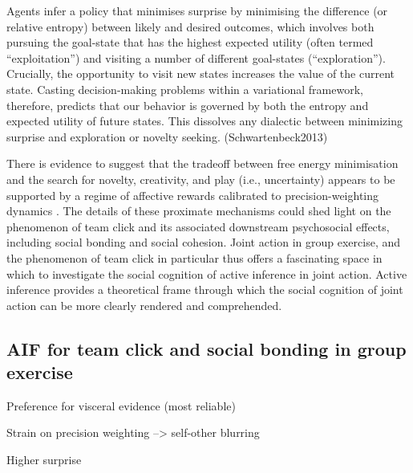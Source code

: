 \begin{CJK}{UTF8}{gbsn}
Agents infer a policy that minimises surprise by minimising the difference (or relative entropy) between likely and desired outcomes, which involves both pursuing the goal-state that has the highest expected utility (often termed “exploitation”) and visiting a number of different goal-states (“exploration”). Crucially, the opportunity to visit new states increases the value of the current state. Casting decision-making problems within a variational framework, therefore, predicts that our behavior is governed by both the entropy and expected utility of future states. This dissolves any dialectic between minimizing surprise and exploration or novelty seeking.
(Schwartenbeck2013)

There is evidence to suggest that the tradeoff between free energy minimisation and the search for novelty, creativity, and play (i.e., uncertainty) appears to be supported by a regime of affective rewards calibrated to precision-weighting dynamics \citep{Chetverikov2016}.
The details of these proximate mechanisms could shed light on the phenomenon of team click and its associated downstream psychosocial effects, including social bonding and social cohesion.  Joint action in group exercise, and the phenomenon of team click in particular thus offers a fascinating space in which to investigate the social cognition of active inference in joint action.  Active inference provides a theoretical frame through which the social cognition of joint action can be more clearly rendered and comprehended.


\subsection{AIF for team click and social bonding in group exercise}


Preference for visceral evidence (most reliable)

Strain on precision weighting --> self-other blurring

Higher surprise






\end{CJK}
